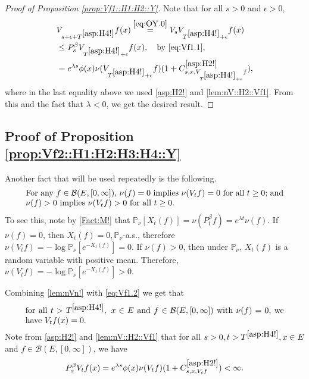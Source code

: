 \documentclass[12pt,a4paper]{amsart}
\numberwithin{equation}{section}
\theoremstyle{plain}
\theoremstyle{definition}
\theoremstyle{remark}
\begin{document}
\begin{proof}[{Proof of Proposition \ref{prop:Vf1::H1:H2::Y}}]
	Note that for all $s>0$ and $\epsilon>0$,
\begin{align}
	& V_{s+\epsilon +T^{\eqref{asp:H4!}}} f (x)
	\overset{\eqref{eq:OY.0}}= V_s V_{T^{\eqref{asp:H4!}}+\epsilon} f(x)
	\\&\leq P_s^\beta V_{T^{\eqref{asp:H4!}} + \epsilon} f(x),\quad\text{by \eqref{eq:Vf1.1}},
 	\\&= e^{\lambda s}\phi(x) \nu( V_{T^{\eqref{asp:H4!}} +\epsilon} f)  (1+ C^{\eqref{asp:H2!}}_{s,x,V_{T^{\eqref{asp:H4!}} + \epsilon} f}),
\label{eq:Vf1.2}
\end{align}
	where in the last equality above  we used \eqref{asp:H2!} and \eqref{lem:nV::H2::Vf1}.
	From this and the fact that $\lambda < 0$, we get the desired result.
\end{proof}

\subsection{Proof of Proposition \ref{prop:Vf2::H1:H2:H3:H4::Y}} \label{sec:Vf2}

	Another fact that will be used repeatedly is the following.
\begin{equation}
\begin{minipage}{0.9\textwidth}
	For any $f\in \mathcal B(E,[0,\infty])$, $\nu(f) = 0$ implies $\nu(V_tf)=0$ for all $t\ge 0$; and $\nu(f)>0$ implies $\nu(V_tf)>0$ for all $t\ge 0$.
\end{minipage}\label{lem:nVn!}
\end{equation}
	To see this, note by \eqref{Fact:M!} that $ \mathbb P_\nu[X_t(f)] = \nu (P_t^\beta f) = e^{\lambda t}\nu (f). $
	If $\nu(f) = 0$, then $X_t(f)=0, \mathbb P_\nu$-a.s., therefore $\nu(V_t f) = - \log \mathbb P_\nu[e^{-X_t(f)}] =0. $
	If $\nu(f) > 0$, then under $\mathbb P_\nu$, $X_t(f)$ is a random variable with positive mean.
	Therefore, $ \nu(V_tf) = - \log \mathbb P_\nu[e^{-X_t(f)}] >0$.

	Combining \eqref{lem:nVn!} with \eqref{eq:Vf1.2} we get that
\begin{equation}
\begin{minipage}{0.9\textwidth}
	for all $t>T^{\eqref{asp:H4!}},~x\in E$ and $f \in \mathcal B(E,[0,\infty])$ with $\nu(f) = 0$, we have $V_t f(x ) = 0$.
\end{minipage} \label{lem:nullVf::H1:H2!}
\end{equation}
Note  from \eqref{asp:H2!} and \eqref{lem:nV::H2::Vf1} that for all $s>0, t> T^{\eqref{asp:H4!}}, x\in E$ and $f\in \mathcal B(E,[0,\infty])$, we have
\begin{equation}
	P_s^\beta V_tf(x)  =e^{\lambda s} \phi(x)\nu(V_tf) (1+C^{\eqref{asp:H2!}}_{s,x,V_tf}) <\infty.
\label{lem:PV:H1:H2!}
\end{equation}
\end{document}

